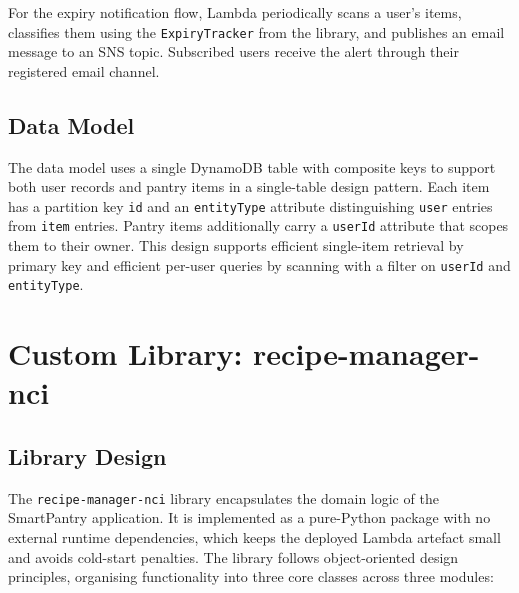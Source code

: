 \documentclass[conference]{IEEEtran}
\begin{document}
For the expiry notification flow, Lambda periodically scans a user's items, classifies them using the \texttt{ExpiryTracker} from the library, and publishes an email message to an SNS topic. Subscribed users receive the alert through their registered email channel.

\subsection{Data Model}

The data model uses a single DynamoDB table with composite keys to support both user records and pantry items in a single-table design pattern. Each item has a partition key \texttt{id} and an \texttt{entityType} attribute distinguishing \texttt{user} entries from \texttt{item} entries. Pantry items additionally carry a \texttt{userId} attribute that scopes them to their owner. This design supports efficient single-item retrieval by primary key and efficient per-user queries by scanning with a filter on \texttt{userId} and \texttt{entityType}.

\section{Custom Library: recipe-manager-nci}

\subsection{Library Design}

The \texttt{recipe-manager-nci} library encapsulates the domain logic of the SmartPantry application. It is implemented as a pure-Python package with no external runtime dependencies, which keeps the deployed Lambda artefact small and avoids cold-start penalties. The library follows object-oriented design principles, organising functionality into three core classes across three modules:
\end{document}

